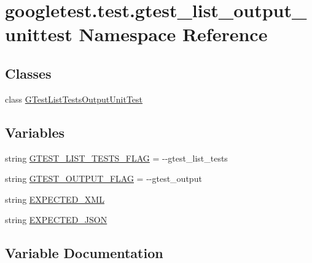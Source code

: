 \hypertarget{namespacegoogletest_1_1test_1_1gtest__list__output__unittest}{}\section{googletest.\+test.\+gtest\+\_\+list\+\_\+output\+\_\+unittest Namespace Reference}
\label{namespacegoogletest_1_1test_1_1gtest__list__output__unittest}
\subsection*{Classes}
\begin{DoxyCompactItemize}
\item 
class \mbox{\hyperlink{classgoogletest_1_1test_1_1gtest__list__output__unittest_1_1_g_test_list_tests_output_unit_test}{G\+Test\+List\+Tests\+Output\+Unit\+Test}}
\end{DoxyCompactItemize}
\subsection*{Variables}
\begin{DoxyCompactItemize}
\item 
string \mbox{\hyperlink{namespacegoogletest_1_1test_1_1gtest__list__output__unittest_a6b3a06ac6e600d73c56aab4252ce8853}{G\+T\+E\+S\+T\+\_\+\+L\+I\+S\+T\+\_\+\+T\+E\+S\+T\+S\+\_\+\+F\+L\+AG}} = \textquotesingle{}-\/-\/gtest\+\_\+list\+\_\+tests\textquotesingle{}
\item 
string \mbox{\hyperlink{namespacegoogletest_1_1test_1_1gtest__list__output__unittest_a75491e5ad76a56822304bd2f9593a535}{G\+T\+E\+S\+T\+\_\+\+O\+U\+T\+P\+U\+T\+\_\+\+F\+L\+AG}} = \textquotesingle{}-\/-\/gtest\+\_\+output\textquotesingle{}
\item 
string \mbox{\hyperlink{namespacegoogletest_1_1test_1_1gtest__list__output__unittest_aae172005b941ec1e744efae81a7c0e05}{E\+X\+P\+E\+C\+T\+E\+D\+\_\+\+X\+ML}}
\item 
string \mbox{\hyperlink{namespacegoogletest_1_1test_1_1gtest__list__output__unittest_a0921d3f52c53ce48d129f3ec4c7fc723}{E\+X\+P\+E\+C\+T\+E\+D\+\_\+\+J\+S\+ON}}
\end{DoxyCompactItemize}


\subsection{Variable Documentation}
\mbox{\label{namespacegoogletest_1_1test_1_1gtest__list__output__unittest_a0921d3f52c53ce48d129f3ec4c7fc723}} 
